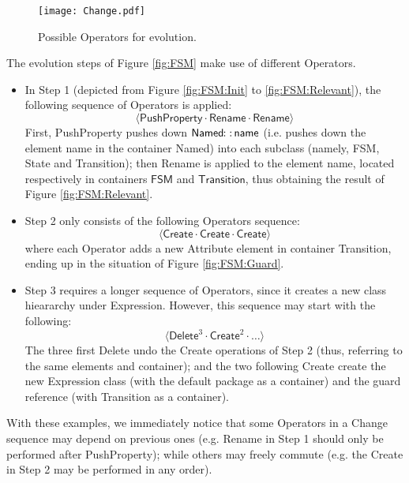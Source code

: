 \begin{figure}[t]
    \centering
    \texttt{[image: Change.pdf]}
    \caption{Possible \textsf{Operator}s for \metamodel evolution.}
    \label{fig:Change}
\end{figure}

The evolution steps of Figure \ref{fig:FSM} make use of different \textsf{Operator}s.
\begin{itemize}
	\item In Step 1 (depicted from Figure \ref{fig:FSM:Init} to \ref{fig:FSM:Relevant}),
	the following sequence of \textsf{Operator}s is applied:
	$$\langle \mathsf{PushProperty} \cdot \mathsf{Rename} \cdot \mathsf{Rename} \rangle$$
	First, \textsf{PushProperty} pushes down $\mathsf{Named} \!\colon\!\colon\! \mathsf{name}$
	(i.e. pushes down the \textsf{element} \textsf{name} in the \textsf{container}
	\textsf{Named})
	into each subclass (namely, \textsf{FSM}, \textsf{State} and \textsf{Transition});
	then \textsf{Rename} is applied to the \textsf{element} \textsf{name}, 
	located respectively in \textsf{container}s $\mathsf{FSM}$ and 
	$\mathsf{Transition}$, thus obtaining the result of Figure \ref{fig:FSM:Relevant}.
	
	\item Step 2 only consists of the following \textsf{Operator}s sequence:
	$$\langle \mathsf{Create} \cdot \mathsf{Create} \cdot \mathsf{Create} \rangle$$
	where each \textsf{Operator} adds a new Attribute \textsf{element} in 
	\textsf{container} \textsf{Transition}, ending up in the situation of
	Figure \ref{fig:FSM:Guard}.
	
	\item Step 3 requires a longer sequence of \textsf{Operator}s, since it creates
	a new class hieararchy under \textsf{Expression}. However, this sequence may
	start with the following:
	$$\langle \mathsf{Delete}^3 \cdot \mathsf{Create}^2 \cdot \ldots \rangle$$
	The three first \textsf{Delete} undo the \textsf{Create} operations of Step 2
	(thus, referring to the same \textsf{element}s and \textsf{container}); and
	the two following \textsf{Create} create the new \textsf{Expression} class
	(with the default package as a \textsf{container}) and the \textsf{guard}
	reference (with \textsf{Transition} as a \textsf{container}).
\end{itemize}
With these examples, we immediately notice that some \textsf{Operator}s
in a \textsf{Change} sequence may depend on previous ones (e.g. \textsf{Rename}
in Step 1 should only be performed after \textsf{PushProperty}); while others
may freely commute (e.g. the \textsf{Create} in Step 2 may be performed in any 
order).